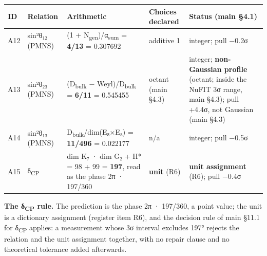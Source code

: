 \documentclass[11pt,a4paper]{article}
\begin{document}
{\footnotesize\setlength{\tabcolsep}{3pt}
\begin{longtable}[]{@{}
  >{\raggedright\arraybackslash}p{}
  >{\raggedright\arraybackslash}p{}
  >{\raggedright\arraybackslash}p{}
  >{\raggedright\arraybackslash}p{}
  >{\raggedright\arraybackslash}p{}@{}}
\toprule\noalign{}
\begin{minipage}[b]{\linewidth}\raggedright
ID
\end{minipage} & \begin{minipage}[b]{\linewidth}\raggedright
Relation
\end{minipage} & \begin{minipage}[b]{\linewidth}\raggedright
Arithmetic
\end{minipage} & \begin{minipage}[b]{\linewidth}\raggedright
Choices declared
\end{minipage} & \begin{minipage}[b]{\linewidth}\raggedright
Status (main §4.1)
\end{minipage} \\
\midrule\noalign{}
\endhead
\bottomrule\noalign{}
\endlastfoot
A12 & sin²θ₁₂ (PMNS) & (1 + N\textsubscript{gen})/α\textsubscript{sum} = \textbf{4/13} = 0.307692 & additive 1 & integer; pull −0.2σ \\
A13 & sin²θ₂₃ (PMNS) & (D\textsubscript{bulk} − Weyl)/D\textsubscript{bulk} = \textbf{6/11} = 0.545455 & octant (main §4.3) & integer; \textbf{non-Gaussian profile} (octant; inside the NuFIT 3σ range, main §4.3); pull +4.4σ, not Gaussian (main §4.3) \\
A14 & sin²θ₁₃ (PMNS) & D\textsubscript{bulk}/dim(E₈×E₈) = \textbf{11/496} = 0.022177 & n/a & integer; pull −0.5σ \\
A15 & δ\textsubscript{CP} & dim K₇ · dim G₂ + H* = 98 + 99 = \textbf{197}, read as the phase 2π · 197/360 & \textbf{unit} (R6) & \textbf{unit assignment} (R6); pull −0.4σ \\
\end{longtable}}

\textbf{The δ\textsubscript{CP} rule.} The prediction is the phase 2π · 197/360, a point value; the unit is a dictionary assignment (register item R6), and the decision rule of main §11.1 for δ\textsubscript{CP} applies: a measurement whose 3σ interval excludes 197° rejects the relation and the unit assignment together, with no repair clause and no theoretical tolerance added afterwards.
\end{document}
